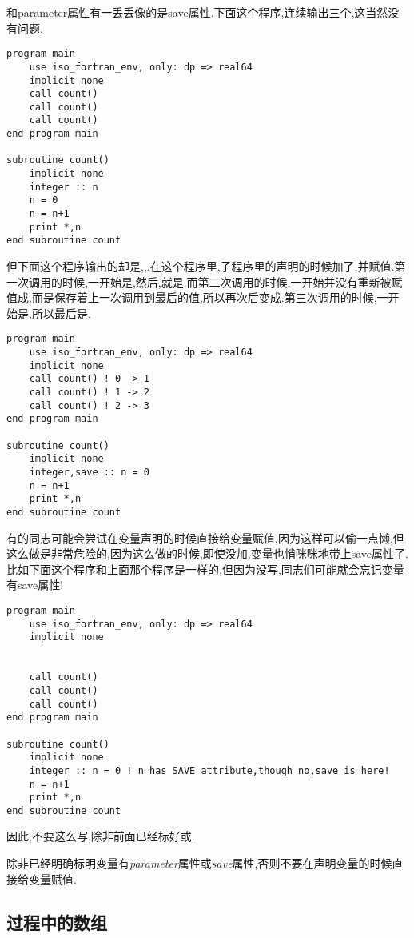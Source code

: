 和parameter属性有一丢丢像的是save属性.下面这个程序,连续输出三个,这当然没有问题.
\begin{lstlisting}
program main
    use iso_fortran_env, only: dp => real64
    implicit none
    call count()
    call count()
    call count()
end program main

subroutine count()
    implicit none
    integer :: n
    n = 0
    n = n+1
    print *,n
end subroutine count
\end{lstlisting}
但下面这个程序输出的却是,,.在这个程序里,子程序里的声明的时候加了,并赋值.第一次调用的时候,一开始是,然后,就是.而第二次调用的时候,一开始并没有重新被赋值成,而是保存着上一次调用到最后的值,所以再次后变成.第三次调用的时候,一开始是,所以最后是.
\begin{lstlisting}
program main
    use iso_fortran_env, only: dp => real64
    implicit none
    call count() ! 0 -> 1
    call count() ! 1 -> 2
    call count() ! 2 -> 3
end program main

subroutine count()
    implicit none
    integer,save :: n = 0
    n = n+1
    print *,n
end subroutine count
\end{lstlisting}
有的同志可能会尝试在变量声明的时候直接给变量赋值,因为这样可以偷一点懒,但这么做是非常危险的,因为这么做的时候,即使没加,变量也悄咪咪地带上save属性了.比如下面这个程序和上面那个程序是一样的,但因为没写,同志们可能就会忘记变量有save属性!
\begin{lstlisting}
program main
    use iso_fortran_env, only: dp => real64
    implicit none


    call count()
    call count()
    call count()
end program main

subroutine count()
    implicit none
    integer :: n = 0 ! n has SAVE attribute,though no,save is here!
    n = n+1
    print *,n
end subroutine count
\end{lstlisting}
因此,不要这么写,除非前面已经标好或.

\begin{convention}
    除非已经明确标明变量有\emph{parameter}属性或\emph{save}属性,否则不要在声明变量的时候直接给变量赋值.
\end{convention}

\subsection{过程中的数组}

